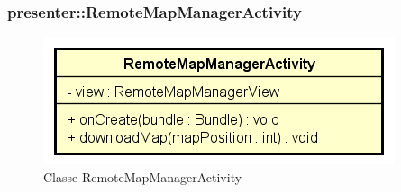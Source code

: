 \documentclass[../DefinizioneDiProdotto.tex]{subfiles}
\begin{document}
\subsubsection{presenter::RemoteMapManagerActivity}

    \begin{figure}[H]
        \centering
        \includegraphics{img/RemoteMapManagerActivity.png}
        \caption{Classe RemoteMapManagerActivity}\label{fig:presenter::RemoteMapManagerActivity} 
    \end{figure}
\end{document}
